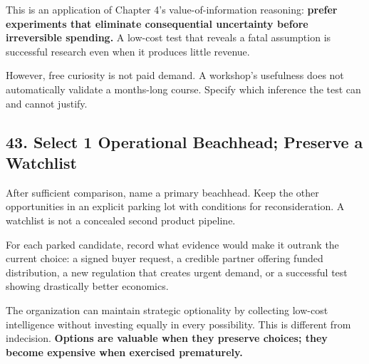 This is an application of Chapter 4's value-of-information reasoning: \textbf{prefer experiments that eliminate consequential uncertainty before irreversible spending.} A low-cost test that reveals a fatal assumption is successful research even when it produces little revenue.

However, free curiosity is not paid demand. A workshop's usefulness does not automatically validate a months-long course. Specify which inference the test can and cannot justify.

\subsection*{43. Select 1 Operational Beachhead; Preserve a Watchlist}

After sufficient comparison, name a primary beachhead. Keep the other opportunities in an explicit parking lot with conditions for reconsideration. A watchlist is not a concealed second product pipeline.

For each parked candidate, record what evidence would make it outrank the current choice: a signed buyer request, a credible partner offering funded distribution, a new regulation that creates urgent demand, or a successful test showing drastically better economics.

The organization can maintain strategic optionality by collecting low-cost intelligence without investing equally in every possibility. This is different from indecision. \textbf{Options are valuable when they preserve choices; they become expensive when exercised prematurely.}
